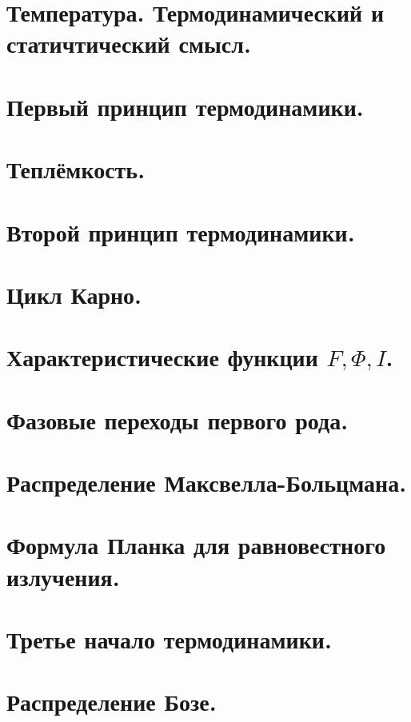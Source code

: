 \begin{multicols*}{2}
		\section{Температура. Термодинамический и статичтический смысл.}
		
		\section{Первый принцип термодинамики.}
		
		\section{Теплёмкость.}
		
		\section{Второй принцип термодинамики.}
		
		\section{Цикл Карно.}
		
		\section{Характеристические функции $F, \Phi, I$.}
		
		\section{Фазовые переходы первого рода.}
		
		\section{Распределение Максвелла-Больцмана.}
		
		\section{Формула Планка для равновестного излучения.}
		
		\section{Третье начало термодинамики.}
		
		\section{Распределение Бозе.}
		

\end{multicols*}

